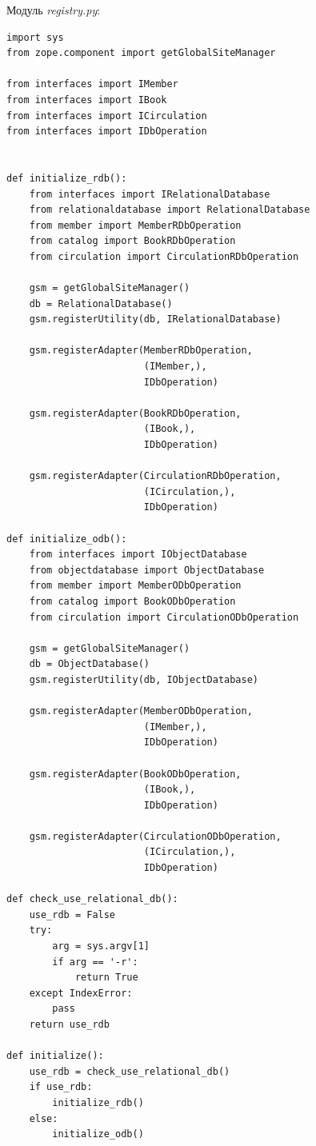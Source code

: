 \documentclass[a4paper,openany,twoside,final]{book}
\providecommand*{\DUroletitlereference}[1]{\textsl{#1}}
\begin{document}
Модуль \DUroletitlereference{registry.py}:

\begin{verbatim}
import sys
from zope.component import getGlobalSiteManager

from interfaces import IMember
from interfaces import IBook
from interfaces import ICirculation
from interfaces import IDbOperation


def initialize_rdb():
    from interfaces import IRelationalDatabase
    from relationaldatabase import RelationalDatabase
    from member import MemberRDbOperation
    from catalog import BookRDbOperation
    from circulation import CirculationRDbOperation

    gsm = getGlobalSiteManager()
    db = RelationalDatabase()
    gsm.registerUtility(db, IRelationalDatabase)

    gsm.registerAdapter(MemberRDbOperation,
                        (IMember,),
                        IDbOperation)

    gsm.registerAdapter(BookRDbOperation,
                        (IBook,),
                        IDbOperation)

    gsm.registerAdapter(CirculationRDbOperation,
                        (ICirculation,),
                        IDbOperation)

def initialize_odb():
    from interfaces import IObjectDatabase
    from objectdatabase import ObjectDatabase
    from member import MemberODbOperation
    from catalog import BookODbOperation
    from circulation import CirculationODbOperation

    gsm = getGlobalSiteManager()
    db = ObjectDatabase()
    gsm.registerUtility(db, IObjectDatabase)

    gsm.registerAdapter(MemberODbOperation,
                        (IMember,),
                        IDbOperation)

    gsm.registerAdapter(BookODbOperation,
                        (IBook,),
                        IDbOperation)

    gsm.registerAdapter(CirculationODbOperation,
                        (ICirculation,),
                        IDbOperation)

def check_use_relational_db():
    use_rdb = False
    try:
        arg = sys.argv[1]
        if arg == '-r':
            return True
    except IndexError:
        pass
    return use_rdb

def initialize():
    use_rdb = check_use_relational_db()
    if use_rdb:
        initialize_rdb()
    else:
        initialize_odb()
\end{verbatim}
\end{document}
